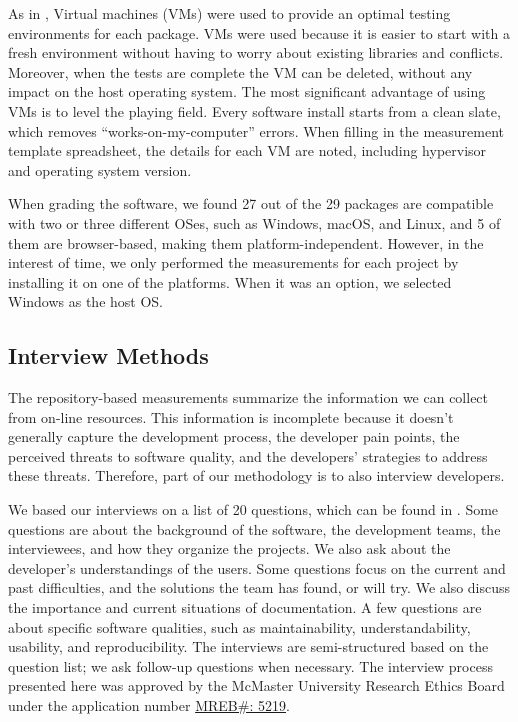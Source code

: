 \documentclass[final, 3p, times, authoryear]{elsarticle}
\begin{document}
As in \citet{SmithEtAl2016}, Virtual machines (VMs) were used to provide an
optimal testing environments for each package. VMs were used because it is
easier to start with a fresh environment without having to worry about existing
libraries and conflicts. Moreover, when the tests are complete the VM can be
deleted, without any impact on the host operating system. The most significant
advantage of using VMs is to level the playing field. Every software install
starts from a clean slate, which removes ``works-on-my-computer'' errors. When
filling in the measurement template spreadsheet, the details for each VM
are noted, including hypervisor and operating system version.

When grading the software, we found 27 out of the 29 packages are compatible
with two or three different OSes, such as Windows, macOS, and Linux, and 5 of
them are browser-based, making them platform-independent. However, in the
interest of time, we only performed the measurements for each project by
installing it on one of the platforms.  When it was an option, we selected
Windows as the host OS.

\subsection{Interview Methods} \label{sec_interview_methods}

The repository-based measurements summarize the information we can collect from
on-line resources. This information is incomplete because it doesn't generally
capture the development process, the developer pain points, the perceived
threats to software quality, and the developers' strategies to address these
threats.  Therefore, part of our methodology is to also interview developers.

We based our interviews on a list of 20 questions, which can be found in
\citet{SmithEtAl2021}. Some questions are about the background of the software,
the development teams, the interviewees, and how they organize the projects. We
also ask about the developer's understandings of the users. Some questions focus
on the current and past difficulties, and the solutions the team has found, or
will try. We also discuss the importance and current situations of
documentation. A few questions are about specific software qualities, such as
maintainability, understandability, usability, and reproducibility. The
interviews are semi-structured based on the question list; we ask follow-up
questions when necessary.  The interview process presented here was approved by
the McMaster University Research Ethics Board under the application number 
\href{https://github.com/smiths/AIMSS/blob/master/StateOfPractice/MACREM/Application.pdf}
{MREB\#: 5219}.
\end{document}
